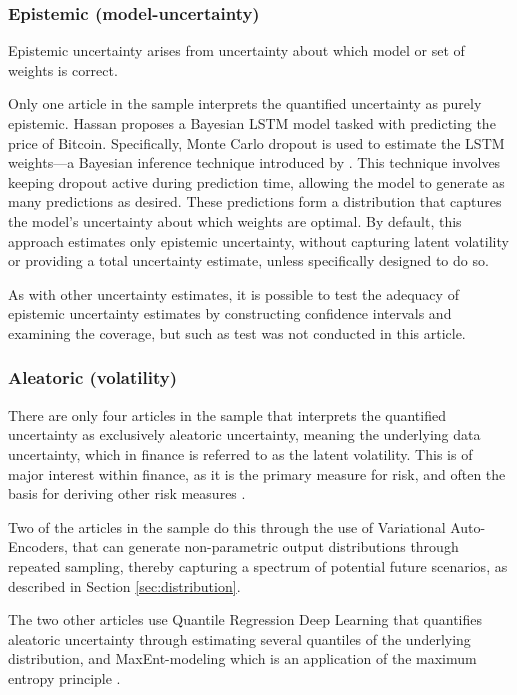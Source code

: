 \subsubsection{Epistemic (model-uncertainty)}
Epistemic uncertainty arises from uncertainty about which model or set of weights is correct.

Only one article in the sample \parencite{Hassan2024Bitcoin} interprets the quantified uncertainty as purely epistemic. Hassan proposes a Bayesian LSTM model tasked with predicting the price of Bitcoin. Specifically, Monte Carlo dropout is used to estimate the LSTM weights—a Bayesian inference technique introduced by \textcite{gal_ghahramani_2015}. This technique involves keeping dropout active during prediction time, allowing the model to generate as many predictions as desired. These predictions form a distribution that captures the model's uncertainty about which weights are optimal. By default, this approach estimates only epistemic uncertainty, without capturing latent volatility or providing a total uncertainty estimate, unless specifically designed to do so.

As with other uncertainty estimates, it is possible to test the adequacy of epistemic uncertainty estimates by constructing confidence intervals and examining the coverage, but such as test was not conducted in this article.


\subsubsection{Aleatoric (volatility)}
There are only four articles in the sample that interprets the quantified uncertainty as exclusively aleatoric uncertainty, meaning the underlying data uncertainty, which in finance is referred to as the latent volatility. This is of major interest within finance, as it is the primary measure for risk, and often the basis for deriving other risk measures \parencite{Brooks2003VolatilityFF}.

Two of the articles in the sample \parencite{arian2022encoded, xing2019sentiment} do this through the use of Variational Auto-Encoders, that can generate non-parametric output distributions through repeated sampling, thereby capturing a spectrum of potential future scenarios, as described in Section \ref{sec:distribution}.

The two other articles use Quantile Regression Deep Learning \parencite{Wang2024GoldForecasting} that quantifies aleatoric uncertainty through estimating several quantiles of the underlying distribution, and MaxEnt-modeling which is an application of the maximum entropy principle \parencite{Horenko2020}.

